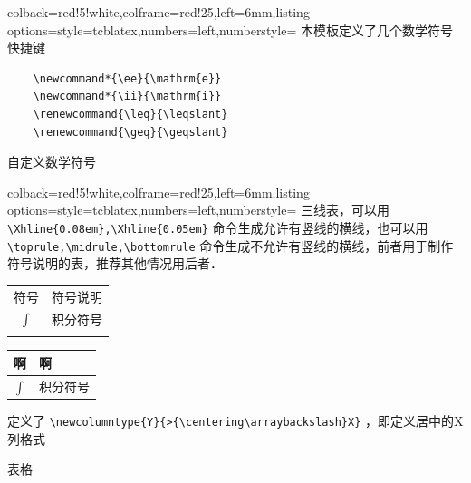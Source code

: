 \documentclass{JXUSTmodeling}
\begin{document}
    \begin{example}[htbp]
        \centering
        \begin{tcblisting}{colback=red!5!white,colframe=red!25,left=6mm,listing options={style=tcblatex,numbers=left,numberstyle=\tiny\color{red!75!black}}}
本模板定义了几个数学符号快捷键
\begin{verbatim}
    \newcommand*{\ee}{\mathrm{e}}
    \newcommand*{\ii}{\mathrm{i}}
    \renewcommand{\leq}{\leqslant}
    \renewcommand{\geq}{\geqslant}
\end{verbatim}
        \end{tcblisting}
        \caption{自定义数学符号}\label{exam:4}
    \end{example}

    \begin{example}[htbp]
        \centering
        \begin{tcblisting}{colback=red!5!white,colframe=red!25,left=6mm,listing options={style=tcblatex,numbers=left,numberstyle=\tiny\color{red!75!black}}}
三线表，可以用 \verb|\Xhline{0.08em},\Xhline{0.05em}| 命令生成允许有竖线的横线，也可以用 \verb|\toprule,\midrule,\bottomrule| 命令生成不允许有竖线的横线，前者用于制作符号说明的表，推荐其他情况用后者．

\parbox[b]{.5\textwidth}{
    \begin{tabularx}{0.5\textwidth}{c@{\hspace{1pc}}|@{\hspace{1pc}}X}
        \Xhline{0.08em}
        符号 & \multicolumn{1}{c}{符号说明}\\
        \Xhline{0.05em}
        $\int$ & 积分符号\\
        \Xhline{0.08em}
    \end{tabularx}
}
\parbox[b]{.5\textwidth}{
    \begin{tabularx}{0.5\textwidth}{YY}
        \toprule
        啊 & 啊\\
        \midrule
        $\int$ & 积分符号\\
        \bottomrule
    \end{tabularx}
}
定义了 \verb|\newcolumntype{Y}{>{\centering\arraybackslash}X}| ，即定义居中的X列格式
    \end{tcblisting}
    \caption{表格}\label{exam:5}
\end{example}
    
\end{document}
